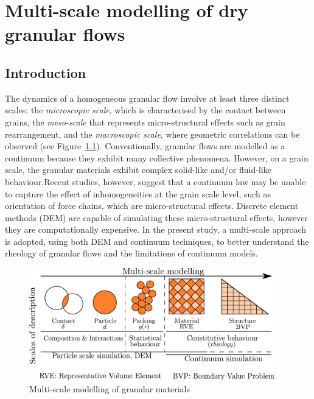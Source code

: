 \chapter{Multi-scale modelling of dry granular flows}

\ifpdf
    \graphicspath{{Chapter4/figs/raster/}{Chapter4/figs/pdf/}{Chapter4/figs/}}
\else
    \graphicspath{{Chapter4/figs/vector/}{Chapter4/figs/}}
\fi

\section{Introduction}

The dynamics of a homogeneous granular flow involve at least three distinct 
scales: the \textit{microscopic scale}, which 
is characterised by the contact between grains, the \textit{meso-scale} that 
represents micro-structural effects such as grain rearrangement, and the 
\textit{macroscopic scale}, where geometric correlations can be observed (see 
Figure~\ref{fig:multiscale}). Conventionally, granular flows are modelled as a 
continuum because they exhibit many collective phenomena. However, on a grain 
scale, the granular materials exhibit complex solid-like and/or fluid-like 
behaviour.Recent studies, however, suggest that a continuum law may be unable 
to capture the effect of inhomogeneities at the grain scale level, such as 
orientation of force chains, which are micro-structural effects. Discrete 
element methods (DEM) are capable of simulating these micro-structural effects, 
however they are computationally expensive. In the present study, a multi-scale 
approach is adopted, using both DEM and continuum techniques, to better 
understand the rheology of granular flows and the limitations of continuum 
models.

\begin{figure}[tbhp]
\centering
\includegraphics[width=0.95\textwidth]{multiscale}
\caption{Multi-scale modelling of granular materials}
\label{fig:multiscale}
\end{figure}

